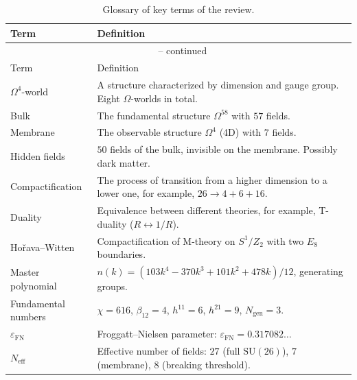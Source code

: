 \documentclass[11pt,a4paper]{article}
\newcommand{\SU}{\mathrm{SU}}
\newcommand{\Om}{\Omega^4}
\newcommand{\Omfi}{\Omega^{58}}
\newcommand{\Ngen}{N_{\text{gen}}}
\newcommand{\Neff}{N_{\text{eff}}}
\newcommand{\epsFN}{\varepsilon_{\text{FN}}}
\theoremstyle{definition}
\begin{document}
\begin{center}
\begin{longtable}{p{3.5cm}p{10cm}}
\caption{Glossary of key terms of the review.}
\label{tab:app-glossary} \\
\toprule
Term & Definition \\
\midrule
\endfirsthead
\multicolumn{2}{c}{{\tablename\ \thetable{} -- continued}} \\
\toprule
Term & Definition \\
\midrule
\endhead
\bottomrule
\endfoot
\bottomrule
\endlastfoot

$\Om$-world & 
    A structure characterized by dimension and gauge 
    group. Eight $\Omega$-worlds in total. \\[0.3em]

Bulk & 
    The fundamental structure $\Omfi$ with $57$ fields. \\[0.3em]

Membrane & 
    The observable structure $\Om$ (4D) with $7$ fields. \\[0.3em]

Hidden fields & 
    $50$ fields of the bulk, invisible on the membrane. Possibly dark 
    matter. \\[0.3em]

Compactification & 
    The process of transition from a higher dimension to a lower one, for example, 
    $26 \to 4 + 6 + 16$. \\[0.3em]

Duality & 
    Equivalence between different theories, for example, 
    T-duality ($R \leftrightarrow 1/R$). \\[0.3em]

Hořava--Witten & 
    Compactification of M-theory on $S^1/Z_2$ with two 
    $E_8$ boundaries. \\[0.3em]

Master polynomial & 
    $n(k) = (103k^4 - 370k^3 + 101k^2 + 478k)/12$, 
    generating groups. \\[0.3em]

Fundamental numbers & 
    $\chi = 616$, $\beta_{12} = 4$, $h^{11} = 6$, 
    $h^{21} = 9$, $\Ngen = 3$. \\[0.3em]

$\epsFN$ & 
    Froggatt--Nielsen parameter: 
    $\epsFN = 0.317082\ldots$ \\[0.3em]

$\Neff$ & 
    Effective number of fields: $27$ (full $\SU(26)$), 
    $7$ (membrane), $8$ (breaking threshold). \\[0.3em]


\end{longtable}
\end{center}
\end{document}
